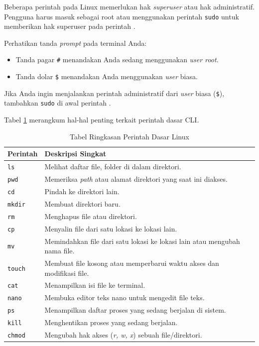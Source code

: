 Beberapa perintah pada Linux memerlukan hak \textit{superuser} atau hak administratif. Pengguna harus masuk sebagai root atau menggunakan perintah \texttt{sudo} untuk memberikan hak superuser pada perintah \cite{shotts2019linux}. 

Perhatikan tanda \textit{prompt} pada terminal Anda:
\begin{itemize}
	\item Tanda pagar \texttt{\#} menandakan Anda sedang menggunakan \textit{user root}.
	\item Tanda dolar \texttt{\$} menandakan Anda menggunakan \textit{user} biasa.
\end{itemize}
Jika Anda ingin menjalankan perintah administratif dari \textit{user} biasa (\texttt{\$}), tambahkan \texttt{sudo} di awal perintah \cite{shotts2019linux}.

Tabel \ref{tab:m03-dasar-teori} merangkum hal-hal penting terkait perintah dasar CLI.
\begin{table}[H]
	\caption{Tabel Ringkasan Perintah Dasar Linux}
	\label{tab:m03-dasar-teori}
	\centering
	\begin{tabular}{|l|p{9cm}|}
		\hline
		\textbf{Perintah} & \textbf{Deskripsi Singkat} \\ \hline
		\texttt{ls} & Melihat daftar file, folder di dalam direktori. \\ \hline
		\texttt{pwd} & Memeriksa \textit{path} atau alamat direktori yang saat ini diakses. \\ \hline
		\texttt{cd} & Pindah ke direktori lain. \\ \hline
		\texttt{mkdir} & Membuat direktori baru. \\ \hline
		\texttt{rm} & Menghapus file atau direktori. \\ \hline
		\texttt{cp} & Menyalin file dari satu lokasi ke lokasi lain. \\ \hline
		\texttt{mv} & Memindahkan file dari satu lokasi ke lokasi lain atau mengubah nama file. \\ \hline
		\texttt{touch} & Membuat file kosong atau memperbarui waktu akses dan modifikasi file. \\ \hline
		\texttt{cat} & Menampilkan isi file ke terminal. \\ \hline
		\texttt{nano} & Membuka editor teks nano untuk mengedit file teks. \\ \hline
		\texttt{ps} & Menampilkan daftar proses yang sedang berjalan di sistem. \\ \hline
		\texttt{kill} & Menghentikan proses yang sedang berjalan. \\ \hline
		\texttt{chmod} & Mengubah hak akses (\textit{r, w, x}) sebuah file/direktori. \\ \hline
	\end{tabular}
\end{table}

